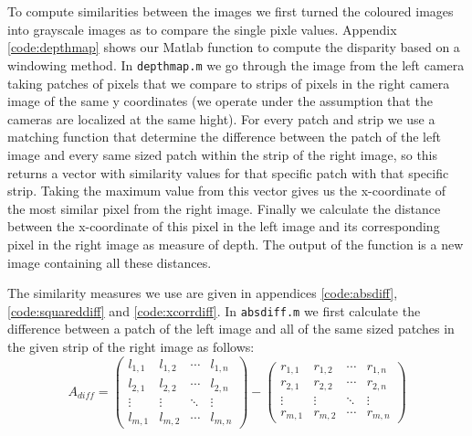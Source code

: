 \documentclass{article}
\begin{document}
\section{}
To compute similarities between the images we first turned the coloured images into grayscale images as to compare the single pixle values. Appendix \ref{code:depthmap} shows our Matlab function to compute the disparity based on a windowing method. In \texttt{depthmap.m} we go through the image from the left camera taking patches of pixels that we compare to strips of pixels in the right camera image of the same y coordinates (we operate under the assumption that the cameras are localized at the same hight). For every patch and strip we use a matching function that determine the difference between the patch of the left image and every same sized patch within the strip of the right image, so this returns a vector with similarity values for that specific patch with that specific strip. Taking the maximum value from this vector gives us the x-coordinate of the most similar pixel from the right image. Finally we calculate the distance between the x-coordinate of this pixel in the left image and its corresponding pixel in the right image as measure of depth. The output of the function is a new image containing all these distances.

The similarity measures we use are given in appendices \ref{code:absdiff}, \ref{code:squareddiff} and \ref{code:xcorrdiff}. In \texttt{absdiff.m} we first calculate the difference between a patch of the left image and all of the same sized patches in the given strip of the right image as follows:
\begin{equation}
A_{diff} = 
 \begin{pmatrix}
  l_{1,1} & l_{1,2} & \cdots & l_{1,n} \\
  l_{2,1} & l_{2,2} & \cdots & l_{2,n} \\
  \vdots  & \vdots  & \ddots & \vdots  \\
  l_{m,1} & l_{m,2} & \cdots & l_{m,n} 
 \end{pmatrix}
-
 \begin{pmatrix}
  r_{1,1} & r_{1,2} & \cdots & r_{1,n} \\
  r_{2,1} & r_{2,2} & \cdots & r_{2,n} \\
  \vdots  & \vdots  & \ddots & \vdots  \\
  r_{m,1} & r_{m,2} & \cdots & r_{m,n} 
 \end{pmatrix} 
\end{equation}
\end{document}

